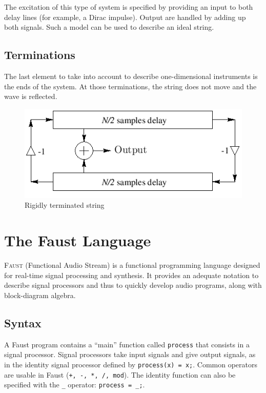 \documentclass[11pt,a4paper]{article}
\newcommand{\f}{\textsc{Faust}}
\begin{document}
The excitation of this type of system is specified by providing an input to both delay lines (for example, a Dirac impulse). Output are handled by adding up both signals. Such a model can be used to describe an ideal string.

\subsection{Terminations}

The last element to take into account to describe one-dimensional instruments is the ends of the system. At those terminations, the string does not move and the wave is reflected.

\begin{figure}
	\centering
	\includegraphics[scale=0.5]{pictures/terminations.png}
	\caption{Rigidly terminated string}
	\label{fig:terminations}
\end{figure}

\section{The Faust Language}

\f{} (Functional Audio Stream) is a functional programming \cite{quickref} language designed for real-time signal processing and synthesis. It provides an adequate notation to describe signal processors and thus to quickly develop audio programs, along with block-diagram algebra.

\subsection{Syntax}

A Faust program contains a ``main'' function called \texttt{process} that consists in a signal processor.
Signal processors take input signals and give output signals, as in the identity signal processor defined by \texttt{process(x) = x;}. Common operators are usable in Faust (\texttt{+, -, *, /, mod}). The identity function can also be specified with the \texttt{\_} operator: \texttt{process = \_;}.
\end{document}

